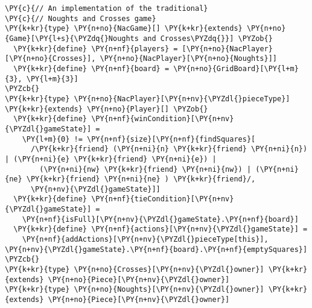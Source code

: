 \begin{Verbatim}[commandchars=\\\{\}]
\PY{c}{// An implementation of the traditional}
\PY{c}{// Noughts and Crosses game}
\PY{k+kr}{type} \PY{n+no}{NacGame}[] \PY{k+kr}{extends} \PY{n+no}{Game}[\PY{l+s}{\PYZdq{}Noughts and Crosses\PYZdq{}}] \PYZob{}
  \PY{k+kr}{define} \PY{n+nf}{players} = [\PY{n+no}{NacPlayer}[\PY{n+no}{Crosses}], \PY{n+no}{NacPlayer}[\PY{n+no}{Noughts}]]
  \PY{k+kr}{define} \PY{n+nf}{board} = \PY{n+no}{GridBoard}[\PY{l+m}{3}, \PY{l+m}{3}]
\PYZcb{}
\PY{k+kr}{type} \PY{n+no}{NacPlayer}[\PY{n+nv}{\PYZdl{}pieceType}] \PY{k+kr}{extends} \PY{n+no}{Player}[] \PYZob{}
  \PY{k+kr}{define} \PY{n+nf}{winCondition}[\PY{n+nv}{\PYZdl{}gameState}] =
    \PY{l+m}{0} != \PY{n+nf}{size}[\PY{n+nf}{findSquares}[
      /\PY{k+kr}{friend} (\PY{n+ni}{n} \PY{k+kr}{friend} \PY{n+ni}{n}) | (\PY{n+ni}{e} \PY{k+kr}{friend} \PY{n+ni}{e}) |
		(\PY{n+ni}{nw} \PY{k+kr}{friend} \PY{n+ni}{nw}) | (\PY{n+ni}{ne} \PY{k+kr}{friend} \PY{n+ni}{ne} ) \PY{k+kr}{friend}/,
      \PY{n+nv}{\PYZdl{}gameState}]]
  \PY{k+kr}{define} \PY{n+nf}{tieCondition}[\PY{n+nv}{\PYZdl{}gameState}] =
    \PY{n+nf}{isFull}[\PY{n+nv}{\PYZdl{}gameState}.\PY{n+nf}{board}]
  \PY{k+kr}{define} \PY{n+nf}{actions}[\PY{n+nv}{\PYZdl{}gameState}] =
    \PY{n+nf}{addActions}[\PY{n+nv}{\PYZdl{}pieceType[this}], \PY{n+nv}{\PYZdl{}gameState}.\PY{n+nf}{board}.\PY{n+nf}{emptySquares}]
\PYZcb{}
\PY{k+kr}{type} \PY{n+no}{Crosses}[\PY{n+nv}{\PYZdl{}owner}] \PY{k+kr}{extends} \PY{n+no}{Piece}[\PY{n+nv}{\PYZdl{}owner}]
\PY{k+kr}{type} \PY{n+no}{Noughts}[\PY{n+nv}{\PYZdl{}owner}] \PY{k+kr}{extends} \PY{n+no}{Piece}[\PY{n+nv}{\PYZdl{}owner}]
\end{Verbatim}
